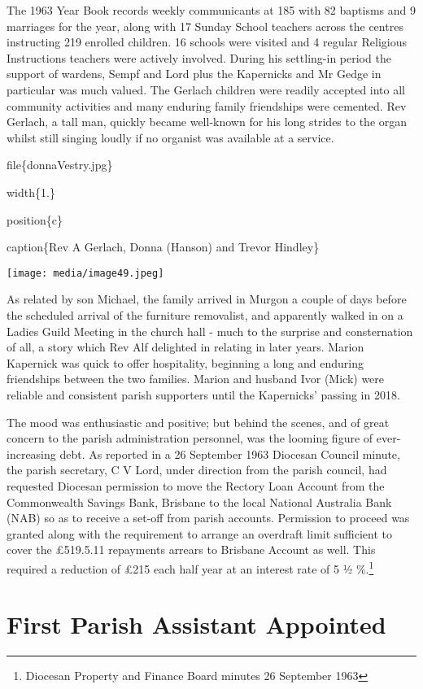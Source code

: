 The 1963 Year Book records weekly communicants at 185 with 82 baptisms and 9 marriages for the year, along with 17 Sunday School teachers across the centres instructing 219 enrolled children. 16 schools were visited and 4 regular Religious Instructions teachers were actively involved. During his settling-in period the support of wardens, Sempf and Lord plus the Kapernicks and Mr Gedge in particular was much valued. The Gerlach children were readily accepted into all community activities and many enduring family friendships were cemented. Rev Gerlach, a tall man, quickly became well-known for his long strides to the organ whilst still singing loudly if no organist was available at a service.

file\{donnaVestry.jpg\}

width\{1.\}

position\{c\}

caption\{Rev A Gerlach, Donna (Hanson) and Trevor Hindley\}

\texttt{[image: media/image49.jpeg]}

As related by son Michael, the family arrived in Murgon a couple of days before the scheduled arrival of the furniture removalist, and apparently walked in on a Ladies Guild Meeting in the church hall - much to the surprise and consternation of all, a story which Rev Alf delighted in relating in later years. Marion Kapernick was quick to offer hospitality, beginning a long and enduring friendships between the two families. Marion and husband Ivor (Mick) were reliable and consistent parish supporters until the Kapernicks' passing in 2018.

The mood was enthusiastic and positive; but behind the scenes, and of great concern to the parish administration personnel, was the looming figure of ever-increasing debt. As reported in a 26 September 1963 Diocesan Council minute, the parish secretary, C V Lord, under direction from the parish council, had requested Diocesan permission to move the Rectory Loan Account from the Commonwealth Savings Bank, Brisbane to the local National Australia Bank (NAB) so as to receive a set-off from parish accounts. Permission to proceed was granted along with the requirement to arrange an overdraft limit sufficient to cover the £519.5.11 repayments arrears to Brisbane Account as well. This required a reduction of £215 each half year at an interest rate of 5 ½ \%.\footnote{Diocesan Property and Finance Board minutes 26 September 1963}

\hypertarget{first-parish-assistant-appointed}{%
\section{First Parish Assistant Appointed}\label{first-parish-assistant-appointed}}

